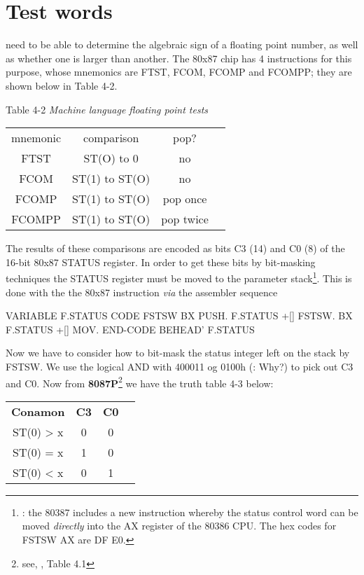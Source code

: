 {{{{\section{Test words}

 need to be able to determine the algebraic sign of a floating point number, as well as whether one is larger than another.
The 80x87 chip has 4 instructions for this purpose, whose mnemonics are FTST, FCOM, FCOMP and FCOMPP; they are shown below in Table 4-2.

Table 4-2 \textit{Machine language floating point tests}
\begin{center}
    \begin{tabular}{|c c c c|}
        mnemonic    &   comparison      &   pop?        \\
        FTST        &   ST(O) to 0      &   no          \\
        FCOM        &   ST(1) to ST(O)  &   no          \\
        FCOMP       &   ST(1) to ST(O)  &   pop once    \\
        FCOMPP      &   ST(1) to ST(O)  &   pop twice   \\
    \end{tabular}
\end{center}

The results of these comparisons are encoded as bits C3 (14) and C0 (8) of the 16-bit 80x87 STATUS register. In order to get these bits by bit-masking techniques the STATUS register must be moved to the parameter stack\footnote{\Note: the 80387 includes a new instruction whereby the status control word can be moved \textit{directly} into the AX register of the 80386 CPU. The hex codes for FSTSW AX are DF E0.}. This is done with the the 80x87 instruction  \textit{via} the assembler sequence

\begin{listing}
    VARIABLE F.STATUS
    CODE FSTSW BX PUSH.
        F.STATUS +[] FSTSW.
        BX F.STATUS +[] MOV.
    END-CODE
    BEHEAD' F.STATUS
\end{listing}

Now we have to consider how to bit-mask the status integer left on the stack by FSTSW. We use the logical AND with 400011 og 0100h (: Why?) to pick out C3 and C0. Now from \textbf{8087P}\footnote{see, \eg, Table 4.1} we have the truth table 4-3 below:

\begin{center}
    \begin{tabular}{|c c c c|}
        \textbf{Conamon}    &   \textbf{C3} & \textbf{C0}   \\
        ST(0) > x           &   0           & 0             \\
        ST(0) = x           &   1           & 0             \\
        ST(0) < x           &   0           & 1             \\
    \end{tabular}
\end{center}

}}}}
